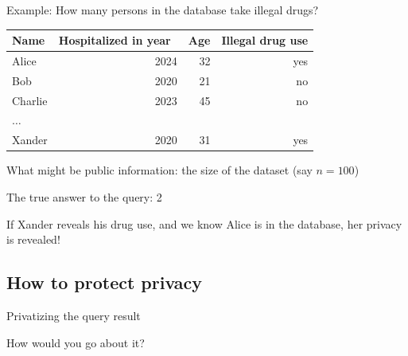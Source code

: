 \documentclass[12pt,aspectratio=169,handout]{beamer}
\begin{document}
\begin{frame}{Example: How many persons in the database take illegal drugs?}

\begin{table}
\scriptsize
\begin{tabular}{lrrr} \toprule
Name & Hospitalized in year & Age & Illegal drug use \\ \midrule
Alice & 2024 & 32 & yes \\
Bob & 2020 & 21 & no \\
Charlie & 2023 & 45 & no \\
$\ldots$ & & & \\
Xander & 2020 & 31 & yes \\ \bottomrule
\end{tabular}
\end{table}

What might be public information: the size of the dataset (say $n = 100$)

The true answer to the query: 2

If Xander reveals his drug use, and we know Alice is in the database, her privacy is revealed!

\end{frame}






\subsection{How to protect privacy}


\begin{frame}{Privatizing the query result}

How would you go about it?

\end{frame}
\end{document}
